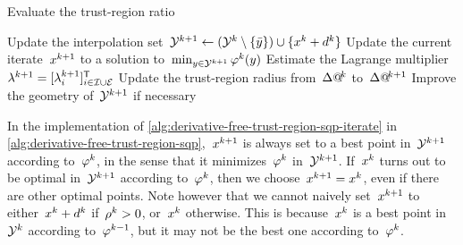 \begin{algorithm}
{        Evaluate the trust-region ratio
        \begin{algomathdisplay}
            \ratio[k] \gets {}
        \end{algomathdisplay}
        Update the interpolation set~$\xpt[k + 1] \gets (\xpt[k] \setminus \set{\bar{y}}) \cup \set{\iter[k] + \step[k]}$\;
        Update the current iterate~$\iter[k + 1]$ to a solution to~$\min_{y \in \xpt[k + 1]} \merit[k](y)$\; 
        Estimate the Lagrange multiplier~$\lm[k + 1] = [\lm[k + 1]_i]_{i \in \iub \cup \ieq}^{\T}$\; 
        Update the trust-region radius from~$\rad[k]$ to~$\rad[k + 1]$\; \label{alg:derivative-free-trust-region-sqp-radius}
        Improve the geometry of~$\xpt[k + 1]$ if necessary\; \label{alg:derivative-free-trust-region-sqp-geometry}
    }
\end{algorithm}

In the implementation of \cref{alg:derivative-free-trust-region-sqp-iterate} in \cref{alg:derivative-free-trust-region-sqp},~$\iter[k + 1]$ is always set to a best point in~$\xpt[k + 1]$ according to~$\merit[k]$, in the sense that it minimizes~$\merit[k]$ in~$\xpt[k + 1]$.
If~$\iter[k]$ turns out to be optimal in~$\xpt[k + 1]$ according to~$\merit[k]$, then we choose~$\iter[k + 1] = \iter[k]$, even if there are other optimal points.
Note however that we cannot naively set~$\iter[k + 1]$ to either~$\iter[k] + \step[k]$ if~$\ratio[k] > 0$, or~$\iter[k]$ otherwise.
This is because~$\iter[k]$ is a best point in~$\xpt[k]$ according to~$\merit[k - 1]$, but it may not be the best one according to~$\merit[k]$.

